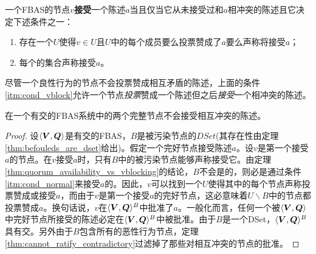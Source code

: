 \begin{definition}[接受]
        一个FBAS的节点$v$\textbf{接受}一个陈述$a$当且仅当它从未接受过和$a$相冲突的陈述且它决定下述条件之一：
        \begin{enumerate}
                \item\label{itm:cond_normal} 存在一个{\quorum}$U$使得$v\in U$且$U$中的每个成员要么投票赞成了$a$要么声称将接受$a$；
                \item\label{itm:cond_vblock} 每个{\vblock}的集合声称接受$a$。 
        \end{enumerate}
\end{definition}

尽管一个良性行为的节点不会投票赞成相互矛盾的陈述，上面的条件\ref{itm:cond_vblock}允许一个节点\textit{投票}赞成一个陈述但之后\textit{接受}一个相冲突的陈述。

\begin{theorem}\label{thm:intact_cannot_accept_contradictory}
        在一个有{\quorum}交的FBAS系统中的两个完整节点不会接受相互冲突的陈述。
\end{theorem}

\begin{proof}
        设$\langle{\bm V},{\bm Q}\rangle$是有{\quorum}交的FBAS，$B$是被污染节点的$DSet$(其存在性由定理\ref{thm:befouleds_are_dset}给出)。假定一个完好节点接受陈述$a$。设$v$是第一个接受$a$的节点。在$v$接受$a$时，只有$B$中的被污染节点能够声称接受它。由定理\ref{thm:quorum_availability_vs_vblocking}的结论，$B$不会是{\vblock}的，则必是通过条件\ref{itm:cond_normal}来接受$a$的。因此，$v$可以找到一个{\quorum}$U$使得其中的每个节点声称投票赞成或接受$a$，而由于$v$是第一个接受$a$的完好节点，这必意味着$U\backslash B$中的节点都投票赞成$a$。换句话说，$v$在$\langle{\bm V},{\bm Q}\rangle^{B}$中批准了$a$。一般化而言，任何一个被$\langle{\bm V},{\bm Q}\rangle$中完好节点所接受的陈述必定在$\langle{\bm V},{\bm Q}\rangle^{B}$中被批准。由于$B$是一个DSet，$\langle{\bm V},{\bm Q}\rangle^{B}$具有{\quorum}交。另外由于$B$包含所有的恶性行为节点，定理\ref{thm:cannot_ratify_contradictory}过滤掉了那些对相互冲突的节点的批准。
\end{proof}